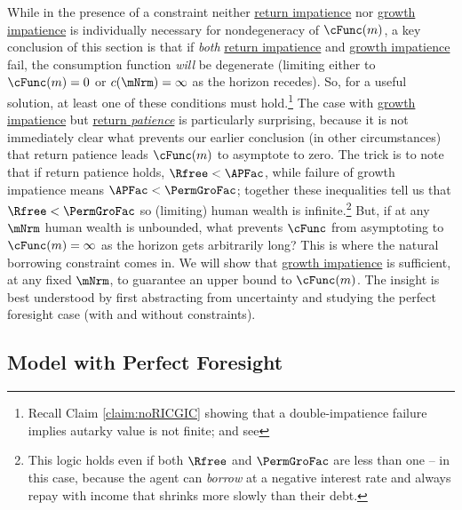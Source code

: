 \documentclass[\econtexRoot/BufferStockTheory]{subfiles}
\begin{document}
While in the presence of a constraint neither \hyperlink{RIC}{return impatience} nor \hyperlink{GICRaw}{growth impatience} is individually necessary for nondegeneracy of $\cFunc(m)$, a key conclusion of this section is that if \emph{both} \hyperlink{RIC}{return impatience} and \hyperlink{GICRaw}{growth impatience} fail, the consumption function \emph{will} be degenerate (limiting either to $\cFunc(m)=0$ or $c(\mNrm)=\infty$ as the horizon recedes).
So, for a useful solution, at least one of these conditions must hold.\footnote{Recall Claim \ref{claim:noRICGIC} showing that a double-impatience failure implies autarky value is not finite; and see } The case with \hyperlink{GICRaw}{growth impatience} but \hyperlink{RIC}{return \emph{patience}} is particularly surprising, because it is not immediately clear what prevents our earlier conclusion (in other circumstances) that return patience leads $\cFunc(m)$ to asymptote to zero.
The trick is to note that if return patience holds, $\Rfree < \APFac$, while failure of growth impatience means $\APFac < \PermGroFac$; together these inequalities tell us that $\Rfree < \PermGroFac$ so (limiting) human wealth is infinite.\footnote{This logic holds even if both $\Rfree$ and $\PermGroFac$ are less than one -- in this case, because the agent can \emph{borrow} at a negative interest rate and always repay with income that shrinks more slowly than their debt.}
But, if at any $\mNrm$ human wealth is unbounded, what prevents $\cFunc$ from asymptoting to $\cFunc(m)=\infty$ as the horizon gets arbitrarily long?
This is where the natural borrowing constraint comes in.
We will show that \hyperlink{GICRaw}{growth impatience} is sufficient, at any fixed $\mNrm$, to guarantee an upper bound to $\cFunc(m)$.
The insight is best understood by first abstracting from uncertainty and studying the perfect foresight case (with and without constraints).

\subsection{Model with Perfect Foresight}\label{subsec:PFBdiscussion}

\hypertarget{ValuePFAnalytical}{}
\hypertarget{Autarky-Value-PF}{}

\end{document}
